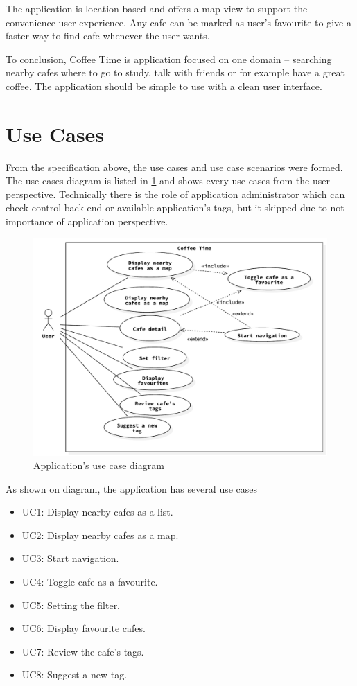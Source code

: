 The application is location-based and offers a map view to support the convenience user experience. Any cafe can be marked as user's favourite to give a faster way to find cafe whenever the user wants. 

To conclusion, Coffee Time is application focused on one domain -- searching nearby cafes where to go to study, talk with friends or for example have a great coffee. The application should be simple to use with a clean user interface. 
\section{Use Cases}
From the specification above, the use cases and use case scenarios were formed. The use cases diagram is listed in \cref{fig:use_case} and shows every use cases from the user perspective. Technically there is the role of application administrator which can check control back-end or available application's tags, but it skipped due to not importance of application perspective. 

\begin{figure}[htp]
    \centering
    \includegraphics[width=\linewidth]{img/analysis/use_case.pdf}
    \caption{Application's use case diagram}
    \label{fig:use_case}
\end{figure}

As shown on diagram, the application has several use cases

\begin{itemize}
    \item UC1: Display nearby cafes as a list.
    \item UC2: Display nearby cafes as a map.
    \item UC3: Start navigation.
    \item UC4: Toggle cafe as a favourite.
    \item UC5: Setting the filter.
    \item UC6: Display favourite cafes.
    \item UC7: Review the cafe's tags.
    \item UC8: Suggest a new tag.
\end{itemize}

